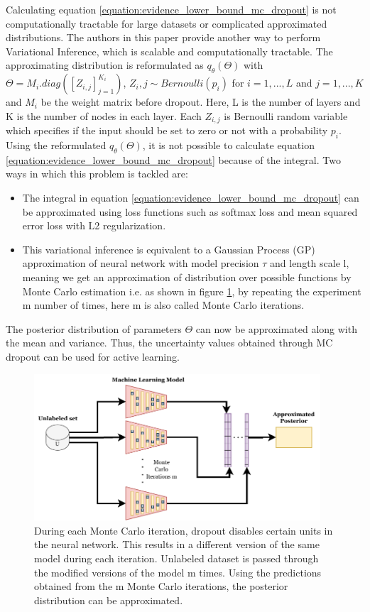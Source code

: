 Calculating equation \ref{equation:evidence_lower_bound_mc_dropout} is not computationally tractable for large datasets or complicated approximated distributions. The authors in this paper provide another way to perform Variational Inference, which is scalable and computationally tractable. The approximating distribution is reformulated as $q_{\theta}(\Theta)$ with $\Theta = M_i . diag([Z_{i, j}]_{j=1}^{K_i})$, $Z_i,j \sim Bernoulli(p_i)$ for $i = 1, ...,L$ and $j = 1, ...,K$ and $M_i$ be the weight matrix before dropout. Here, L is the number of layers and K is the number of nodes in each layer. Each $Z_{i,j}$ is Bernoulli random variable which specifies if the input should be set to zero or not with a probability $p_i$. \\
Using the reformulated $q_{\theta}(\Theta)$, it is not possible to calculate equation \ref{equation:evidence_lower_bound_mc_dropout} because of the integral. Two ways in which this problem is tackled are:
\begin{itemize}
  \setlength\itemsep{0em}
  \item The integral in equation \ref{equation:evidence_lower_bound_mc_dropout} can be approximated using loss functions such as softmax loss and mean squared error loss with L2 regularization.
  \item This variational inference is equivalent to a Gaussian Process (GP) approximation of neural network with model precision $\tau$ and length scale l, meaning we get an approximation of distribution over possible functions by Monte Carlo estimation\cite{raychaudhuri2008} i.e. as shown in figure \ref{fig:mc_dropout}, by repeating the experiment m number of times, here m is also called Monte Carlo iterations.
\end{itemize}
The posterior distribution of parameters $\Theta$ can now be approximated along with the mean and variance. Thus, the uncertainty values obtained through MC dropout can be used for active learning.

\begin{figure}[htbp]
\centering
\captionsetup{format=plain}
\includegraphics[keepaspectratio,width=0.95\textwidth]{figures/fig_mc_dropout.pdf}
\caption{During each Monte Carlo iteration, dropout disables certain units in the neural network. This results in a different version of the same model during each iteration. Unlabeled dataset is passed through the modified versions of the model m times. Using the predictions obtained from the m Monte Carlo iterations, the posterior distribution can be approximated.}
\label{fig:mc_dropout}
\end{figure}

